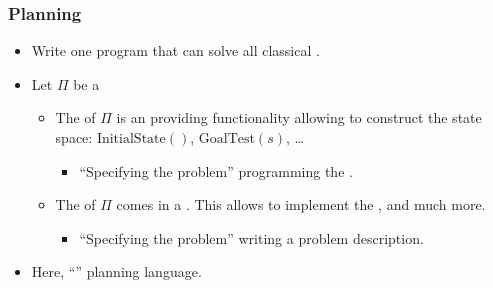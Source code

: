 \documentclass[notes,mh]{mikoslides}
\begin{document}
\begin{module}[id=planning-vs-search]

\begin{frame}
  \frametitle{Planning}
  \begin{itemize}
  \item
    \begin{omtext}[title=Ambition]
      Write one program that can solve all classical
      .
    \end{omtext}
  \item
    \begin{definition}
      Let $\Pi$ be a 
      \begin{itemize}
      \item The  of $\Pi$ is an  providing
        functionality allowing to construct the state space: $\text{InitialState}()$,
        $\text{GoalTest}(s)$, \dots
        \begin{itemize}
        \item ``Specifying the problem'' \hateq programming the .
        \end{itemize}
      \item The  of $\Pi$ comes in a
        . This allows to implement the
        , and much more.
        \begin{itemize}
        \item ``Specifying the problem'' \hateq writing a problem description.
        \end{itemize}
      \end{itemize}
    \end{definition}
  \item Here, ``'' \hateq planning language.
  \end{itemize}
\end{frame}
\end{module}
\end{document}
